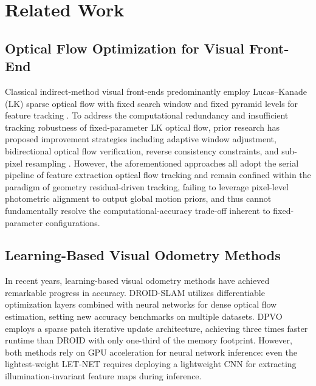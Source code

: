 \documentclass[journal,twoside,web]{ieeecolor}
\begin{document}
\section{Related Work}

\subsection{Optical Flow Optimization for Visual Front-End}

Classical indirect-method visual front-ends predominantly employ Lucas--Kanade (LK) sparse optical flow with fixed search window and fixed pyramid levels for feature tracking \cite{baker2004lucas}. To address the computational redundancy and insufficient tracking robustness of fixed-parameter LK optical flow, prior research has proposed improvement strategies including adaptive window adjustment, bidirectional optical flow verification, reverse consistency constraints, and sub-pixel resampling \cite{shi1994goodfeatures}. However, the aforementioned approaches all adopt the serial pipeline of feature extraction optical flow tracking and remain confined within the paradigm of geometry residual-driven tracking, failing to leverage pixel-level photometric alignment to output global motion priors, and thus cannot fundamentally resolve the computational-accuracy trade-off inherent to fixed-parameter configurations.

\subsection{Learning-Based Visual Odometry Methods}

In recent years, learning-based visual odometry methods have achieved remarkable progress in accuracy. DROID-SLAM \cite{teed2021droid} utilizes differentiable optimization layers combined with neural networks for dense optical flow estimation, setting new accuracy benchmarks on multiple datasets. DPVO \cite{teed2023dpvo} employs a sparse patch iterative update architecture, achieving three times faster runtime than DROID with only one-third of the memory footprint. However, both methods rely on GPU acceleration for neural network inference: even the lightest-weight LET-NET \cite{lin2024letnet} requires deploying a lightweight CNN for extracting illumination-invariant feature maps during inference.
\end{document}
